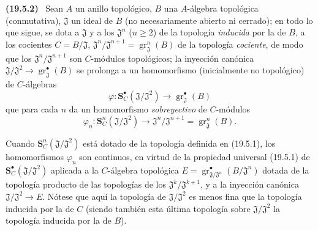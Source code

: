 \documentclass[10pt,oneside]{book}
\makeatletter
\newcommand{\gr}{\operatorname{gr}}
\newcommand{\setmanualcurrentlabel}[1]{\def\@currentlabel{#1}}
\newcommand{\oldpage}[2][]{%
  \setcounter{footnote}{0}%
  \marginpar{\scriptsize\textbf{#1}~|~#2}\ignorespaces}
\newenvironment{env}[1][]{\setmanualcurrentlabel{#1}\par\medskip\noindent\textbf{(#1)}\ }{\par}
\makeatother
\begin{document}
\begin{env}[19.5.2]
\label{0.19.5.2-es}
Sean $A$ un anillo topológico, $B$ una $A$-álgebra topológica
(conmutativa), $\mathfrak J$ un ideal de $B$ (no necesariamente abierto ni
cerrado); en todo lo que sigue, se dota a $\mathfrak J$ y a los
$\mathfrak J^n$ ($n\geq2$) de la topología \emph{inducida} por la de $B$,
a los cocientes $C=B/\mathfrak J$,
$\mathfrak J^n/\mathfrak J^{n+1}=\gr_{\mathfrak J}^n(B)$ de la topología
\emph{cociente}, de modo que los $\mathfrak J^n/\mathfrak J^{n+1}$ son
$C$-módulos topológicos; la inyección canónica
$\mathfrak J/\mathfrak J^2\to\gr_{\mathfrak J}^\bullet(B)$ se prolonga a un
homomorfismo (inicialmente no topológico) de $C$-álgebras
\[
  \varphi:\mathbf S_C^\bullet(\mathfrak J/\mathfrak J^2)
  \longrightarrow\gr_{\mathfrak J}^\bullet(B)
\]
que para cada $n$ da un homomorfismo \emph{sobreyectivo} de $C$-módulos
\begin{equation}
\label{0.19.5.2.1-es}
  \varphi_n:\mathbf S_C^n(\mathfrak J/\mathfrak J^2)
  \longrightarrow\mathfrak J^n/\mathfrak J^{n+1}
  =\gr_{\mathfrak J}^n(B).
  \tag{19.5.2.1}
\end{equation}

\oldpage[0\textsubscript{IV-1}]{91}

Cuando $\mathbf S_C^n(\mathfrak J/\mathfrak J^2)$ está dotado de la topología
definida en (19.5.1), los homomorfismos $\varphi_n$ son continuos, en virtud
de la propiedad universal (19.5.1) de
$\mathbf S_C^\bullet(\mathfrak J/\mathfrak J^2)$ aplicada a la $C$-álgebra
topológica $E=\gr^\bullet_{\mathfrak J/\mathfrak J^n}(B/\mathfrak J^n)$ dotada de la
topología producto de las topologías de los $\mathfrak J^k/\mathfrak J^{k+1}$, y a
la inyección canónica $\mathfrak J/\mathfrak J^2\to E$. Nótese que aquí la
topología de $\mathfrak J/\mathfrak J^2$ es menos fina que la topología
inducida por la de $C$ (siendo también esta última topología sobre
$\mathfrak J/\mathfrak J^2$ la topología inducida por la de $B$).
\end{env}
\end{document}
